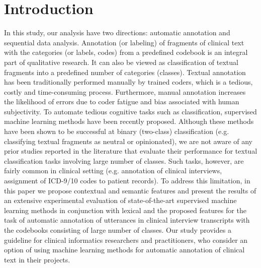 \documentclass{amia}
\begin{document}
\section*{Introduction}
In this study, our analysis have two directions: automatic annotation and sequential data analysis. Annotation (or labeling) of fragments of clinical text with the categories (or labels, codes) from a predefined codebook is an integral part of qualitative research. It can also be viewed as classification of textual fragments into a predefined number of categories (classes). Textual annotation has been traditionally performed manually by trained coders, which is a tedious, costly and time-consuming process. Furthermore, manual annotation increases the likelihood of errors due to coder fatigue and bias associated with human subjectivity. To automate tedious cognitive tasks such as classification, supervised machine learning methods have been recently proposed. Although these methods have been shown to be successful at binary (two-class) classification \citep{40,41} (e.g. classifying textual fragments as neutral or opinionated), we are not aware of any prior studies reported in the literature that evaluate their performance for textual classification tasks involving large number of classes. Such tasks, however, are fairly common in clinical setting (e.g. annotation of clinical interviews, assignment of ICD-9/10 codes to patient records). To address this limitation, in this paper we propose contextual and semantic features and present the results of an extensive experimental evaluation of state-of-the-art supervised machine learning methods in conjunction with lexical and the proposed features for the task of automatic annotation of utterances in clinical interview transcripts with the codebooks consisting of large number of classes. Our study provides a guideline for clinical informatics researchers and practitioners, who consider an option of using machine learning methods for automatic annotation of clinical text in their projects.
\end{document}

